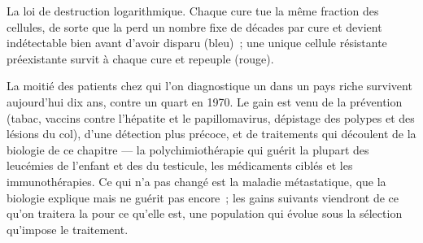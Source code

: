\begin{omfigure}

{\small La loi de destruction logarithmique. Chaque cure tue la même
fraction des cellules, de sorte que la  perd un nombre fixe de
décades par cure et devient indétectable bien avant d'avoir disparu
(bleu)~; une unique cellule résistante préexistante survit à chaque
cure et repeuple (rouge).}
\end{omfigure}

\begin{remark}\label{rem:b3:cancer-biology:changed}
La moitié des patients chez qui l'on diagnostique un  dans un
pays riche survivent aujourd'hui dix ans, contre un quart en 1970. Le
gain est venu de la prévention (tabac, vaccins contre l'hépatite et le
papillomavirus, dépistage des polypes et des lésions du col), d'une
détection plus précoce, et de traitements qui découlent de la biologie
de ce chapitre --- la polychimiothérapie qui guérit la plupart des
leucémies de l'enfant et des  du testicule, les médicaments
ciblés et les immunothérapies. Ce qui n'a pas changé est la maladie
métastatique, que la biologie explique mais ne guérit pas encore~; les
gains suivants viendront de ce qu'on traitera la  pour ce qu'elle
est, une population qui évolue sous la sélection qu'impose le
traitement.
\end{remark}

